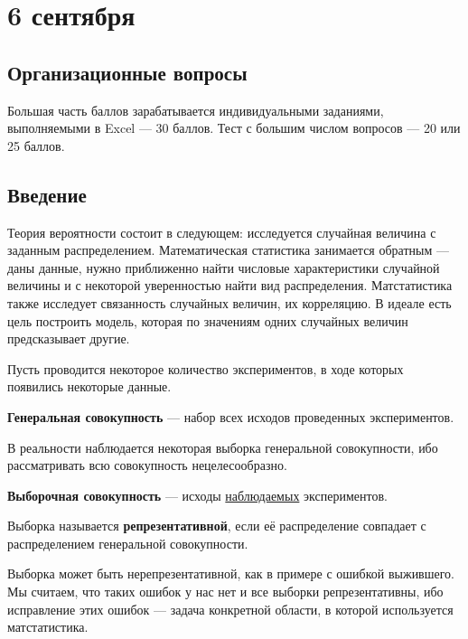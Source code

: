 \chapter{6 сентября}

\section{Организационные вопросы}

Большая часть баллов зарабатывается индивидуальными заданиями, выполняемыми в Excel --- 30 баллов. Тест с большим числом вопросов --- 20 или 25 баллов.

\section{Введение}

Теория вероятности состоит в следующем: исследуется случайная величина с заданным распределением. Математическая статистика занимается обратным --- даны данные, нужно приближенно найти числовые характеристики случайной величины и с некоторой уверенностью найти вид распределения. Матстатистика также исследует связанность случайных величин, их корреляцию. В идеале есть цель построить модель, которая по значениям одних случайных величин предсказывает другие.

Пусть проводится некоторое количество экспериментов, в ходе которых появились некоторые данные.
\begin{definition}
    \textbf{Генеральная совокупность} --- набор всех исходов проведенных экспериментов.
\end{definition}

В реальности наблюдается некоторая выборка генеральной совокупности, ибо рассматривать всю совокупность нецелесообразно.

\begin{definition}
    \textbf{Выборочная совокупность} --- исходы \underline{наблюдаемых} экспериментов.
\end{definition}

\begin{definition}
    Выборка называется \textbf{репрезентативной}, если её распределение совпадает с распределением генеральной совокупности.
\end{definition}

Выборка может быть нерепрезентативной, как в примере с ошибкой выжившего. Мы считаем, что таких ошибок у нас нет и все выборки репрезентативны, ибо исправление этих ошибок --- задача конкретной области, в которой используется матстатистика.

